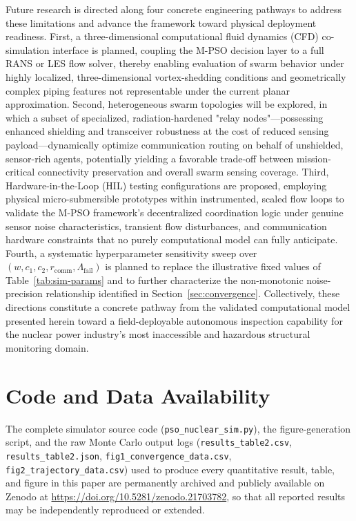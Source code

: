 \documentclass[journal]{IEEEtran}
\begin{document}
Future research is directed along four concrete engineering pathways to address these limitations and advance the framework toward physical deployment readiness. First, a three-dimensional computational fluid dynamics (CFD) co-simulation interface is planned, coupling the M-PSO decision layer to a full RANS or LES flow solver, thereby enabling evaluation of swarm behavior under highly localized, three-dimensional vortex-shedding conditions and geometrically complex piping features not representable under the current planar approximation. Second, heterogeneous swarm topologies will be explored, in which a subset of specialized, radiation-hardened "relay nodes"---possessing enhanced shielding and transceiver robustness at the cost of reduced sensing payload---dynamically optimize communication routing on behalf of unshielded, sensor-rich agents, potentially yielding a favorable trade-off between mission-critical connectivity preservation and overall swarm sensing coverage. Third, Hardware-in-the-Loop (HIL) testing configurations are proposed, employing physical micro-submersible prototypes within instrumented, scaled flow loops to validate the M-PSO framework's decentralized coordination logic under genuine sensor noise characteristics, transient flow disturbances, and communication hardware constraints that no purely computational model can fully anticipate. Fourth, a systematic hyperparameter sensitivity sweep over $(w, c_1, c_2, r_{\text{comm}}, \Lambda_{\text{fail}})$ is planned to replace the illustrative fixed values of Table~\ref{tab:sim-params} and to further characterize the non-monotonic noise-precision relationship identified in Section~\ref{sec:convergence}. Collectively, these directions constitute a concrete pathway from the validated computational model presented herein toward a field-deployable autonomous inspection capability for the nuclear power industry's most inaccessible and hazardous structural monitoring domain.

\section*{Code and Data Availability}
The complete simulator source code (\texttt{pso\_nuclear\_sim.py}), the figure-generation script, and the raw Monte Carlo output logs (\texttt{results\_table2.csv}, \texttt{results\_table2.json}, \texttt{fig1\_convergence\_data.csv}, \texttt{fig2\_trajectory\_data.csv}) used to produce every quantitative result, table, and figure in this paper are permanently archived and publicly available on Zenodo at \url{https://doi.org/10.5281/zenodo.21703782}, so that all reported results may be independently reproduced or extended.



\end{document}
